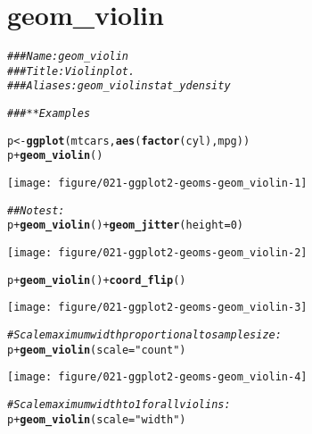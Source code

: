 \documentclass[a4paper,titlepage]{tufte-handout}\usepackage[]{graphicx}\usepackage[]{color}
\makeatletter
\def\maxwidth{ %
  \ifdim\Gin@nat@width>\linewidth
    \linewidth
  \else
    \Gin@nat@width
  \fi
}
\newcommand{\hlnum}[1]{\textcolor[rgb]{0.686,0.059,0.569}{#1}}%
\newcommand{\hlstr}[1]{\textcolor[rgb]{0.192,0.494,0.8}{#1}}%
\newcommand{\hlcom}[1]{\textcolor[rgb]{0.678,0.584,0.686}{\textit{#1}}}%
\newcommand{\hlopt}[1]{\textcolor[rgb]{0,0,0}{#1}}%
\newcommand{\hlstd}[1]{\textcolor[rgb]{0.345,0.345,0.345}{#1}}%
\newcommand{\hlkwb}[1]{\textcolor[rgb]{0.69,0.353,0.396}{#1}}%
\newcommand{\hlkwc}[1]{\textcolor[rgb]{0.333,0.667,0.333}{#1}}%
\newcommand{\hlkwd}[1]{\textcolor[rgb]{0.737,0.353,0.396}{\textbf{#1}}}%
\newenvironment{kframe}{%
 \def\at@end@of@kframe{}%
 \ifinner\ifhmode%
  \def\at@end@of@kframe{\end{minipage}}%
  \begin{minipage}{\columnwidth}%
 \fi\fi%
 \def\FrameCommand##1{\hskip\@totalleftmargin \hskip-\fboxsep
 \colorbox{shadecolor}{##1}\hskip-\fboxsep
     \hskip-\linewidth \hskip-\@totalleftmargin \hskip\columnwidth}%
 \MakeFramed {\advance\hsize-\width
   \@totalleftmargin\z@ \linewidth\hsize
   \@setminipage}}%
 {\par\unskip\endMakeFramed%
 \at@end@of@kframe}
\newenvironment{knitrout}{}{} %
\makeatother
\begin{document}
\section{geom\_violin}

\begin{knitrout}
\color{fgcolor}\begin{kframe}
\begin{alltt}
\hlcom{### Name: geom_violin}
\hlcom{### Title: Violin plot.}
\hlcom{### Aliases: geom_violin stat_ydensity}

\hlcom{### ** Examples}

\hlstd{p} \hlkwb{<-} \hlkwd{ggplot}\hlstd{(mtcars,} \hlkwd{aes}\hlstd{(}\hlkwd{factor}\hlstd{(cyl), mpg))}
\hlstd{p} \hlopt{+} \hlkwd{geom_violin}\hlstd{()}
\end{alltt}
\end{kframe}
\texttt{[image: figure/021-ggplot2-geoms-geom\_violin-1]} 
\begin{kframe}\begin{alltt}
\hlcom{## No test: }
\hlstd{p} \hlopt{+} \hlkwd{geom_violin}\hlstd{()} \hlopt{+} \hlkwd{geom_jitter}\hlstd{(}\hlkwc{height} \hlstd{=} \hlnum{0}\hlstd{)}
\end{alltt}
\end{kframe}
\texttt{[image: figure/021-ggplot2-geoms-geom\_violin-2]} 
\begin{kframe}\begin{alltt}
\hlstd{p} \hlopt{+} \hlkwd{geom_violin}\hlstd{()} \hlopt{+} \hlkwd{coord_flip}\hlstd{()}
\end{alltt}
\end{kframe}
\texttt{[image: figure/021-ggplot2-geoms-geom\_violin-3]} 
\begin{kframe}\begin{alltt}
\hlcom{# Scale maximum width proportional to sample size:}
\hlstd{p} \hlopt{+} \hlkwd{geom_violin}\hlstd{(}\hlkwc{scale} \hlstd{=} \hlstr{"count"}\hlstd{)}
\end{alltt}
\end{kframe}
\texttt{[image: figure/021-ggplot2-geoms-geom\_violin-4]} 
\begin{kframe}\begin{alltt}
\hlcom{# Scale maximum width to 1 for all violins:}
\hlstd{p} \hlopt{+} \hlkwd{geom_violin}\hlstd{(}\hlkwc{scale} \hlstd{=} \hlstr{"width"}\hlstd{)}
\end{alltt}
\end{kframe}

\end{knitrout}
\end{document}
